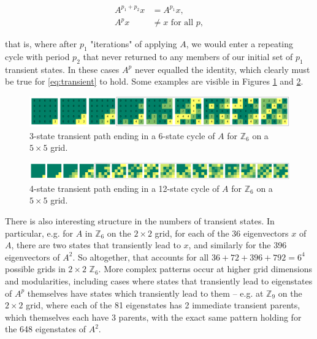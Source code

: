 \documentclass[11pt]{article}
\newcommand{\modZ}[1]{$\mathbb{Z}_{#1}$}
\begin{document}
\begin{equation}
\begin{split}
  A^{p_1 + p_2}x & = A^{p_1}x,\\
  A^{p}x & \neq x \text{ for all } p,
\end{split}
\label{eq:transient}
\end{equation}

\noindent that is, where after $p_1$ "iterations" of applying $A$, we would enter a repeating cycle with period $p_2$ that never returned to any members of our initial set of $p_1$ transient states. In these cases $A^p$ never equalled the identity, which clearly must be true for \eqref{eq:transient} to hold. Some examples are visible in Figures \ref{655-transient} and \ref{655-transient-long}.

\begin{figure}[H]
  \caption{3-state transient path ending in a 6-state cycle of $A$ for \modZ{6} on a $5 \times 5$ grid.}
  \label{655-transient}
  \includegraphics[width=\textwidth]{655-transient.png}
\end{figure}

\begin{figure}[H]
  \caption{4-state transient path ending in a 12-state cycle of $A$ for \modZ{6} on a $5 \times 5$ grid.}
  \label{655-transient-long}
  \includegraphics[width=\textwidth]{655-transient-long.png}
\end{figure}

There is also interesting structure in the numbers of transient states. In particular, e.g. for $A$ in \modZ{6} on the $2 \times 2$ grid, for each of the 36 eigenvectors $x$ of $A$, there are two states that transiently lead to $x$, and similarly for the 396 eigenvectors of $A^2$. So altogether, that accounts for all $36+72+396+792=6^4$ possible grids in $2 \times 2$ \modZ{6}. More complex patterns occur at higher grid dimensions and modularities, including cases where states that transiently lead to eigenstates of $A^p$ themselves have states which transiently lead to them -- e.g. at \modZ{9} on the $2 \times 2$ grid, where each of the 81 eigenstates has 2 immediate transient parents, which themselves each have 3 parents, with the exact same pattern holding for the 648 eigenstates of $A^2$.
\end{document}
